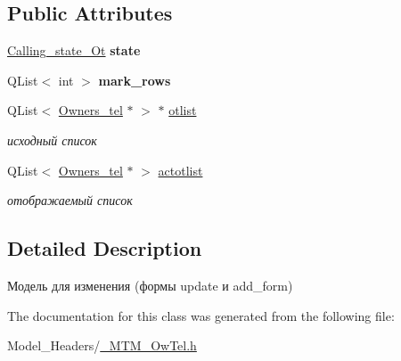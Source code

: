 \subsection*{Public Attributes}
\begin{DoxyCompactItemize}
\item 
\mbox{\label{class_m_t_m___ow_tel_a5fdd6386ae83b51a2ec134f275aec3b9}} 
\mbox{\hyperlink{___m_t_m___ow_tel_8h_a8fbe4fe3844038a994df1513bb386a4f}{Calling\+\_\+state\+\_\+\+Ot}} {\bfseries state}
\item 
\mbox{\label{class_m_t_m___ow_tel_a77357032dc7b48815f57292ad7e20335}} 
Q\+List$<$ int $>$ {\bfseries mark\+\_\+rows}
\item 
\mbox{\label{class_m_t_m___ow_tel_a8086c028e6acf9089e10d85075cd5fc0}} 
Q\+List$<$ \mbox{\hyperlink{class_owners__tel}{Owners\+\_\+tel}} $\ast$ $>$ $\ast$ \mbox{\hyperlink{class_m_t_m___ow_tel_a8086c028e6acf9089e10d85075cd5fc0}{otlist}}
\begin{DoxyCompactList}\small\item\em исходный список \end{DoxyCompactList}\item 
\mbox{\label{class_m_t_m___ow_tel_a1a9316769f08ee3a9eae8cf4cc092ca6}} 
Q\+List$<$ \mbox{\hyperlink{class_owners__tel}{Owners\+\_\+tel}} $\ast$ $>$ \mbox{\hyperlink{class_m_t_m___ow_tel_a1a9316769f08ee3a9eae8cf4cc092ca6}{actotlist}}
\begin{DoxyCompactList}\small\item\em отображаемый список \end{DoxyCompactList}\end{DoxyCompactItemize}


\subsection{Detailed Description}
Модель для изменения (формы update и add\+\_\+form) 

The documentation for this class was generated from the following file\+:\begin{DoxyCompactItemize}
\item 
Model\+\_\+\+Headers/\mbox{\hyperlink{___m_t_m___ow_tel_8h}{\+\_\+\+M\+T\+M\+\_\+\+Ow\+Tel.\+h}}\end{DoxyCompactItemize}
